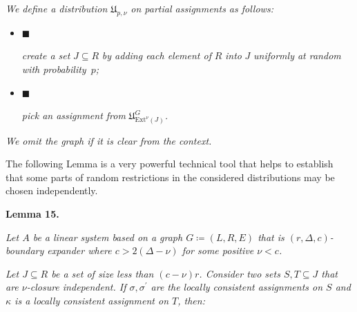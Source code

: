 \emph{We define a distribution $\mathfrak{U}_{p,\nu}$ on partial assignments as follows:}\par


\begin{itemize}


\item[] 
$\blacksquare$ 


\emph{create a set }$J\subseteq R$\emph{ by adding each element of }$R$\emph{ into }$J$\emph{ uniformly at random
with probability }$p$\emph{;}\par





\item[] 
$\blacksquare$ 


\emph{pick an assignment from }$\mathfrak{U}^{G}_{\mathrm{Ext}^{\nu}\left(J\right)}$\emph{.}\par





\end{itemize}




\emph{We omit the graph if it is clear from the context.}\par






The following Lemma is a very powerful technical tool that helps to establish that some parts of random
restrictions in the considered distributions may be chosen independently.\par





\par\medskip\noindent\textbf{
\textbf{Lemma 15}\textbf{.}
}\par



\emph{Let $A$ be a linear system based on a graph $G\coloneqq(L,R,E)$ that is $(r,\Delta,c)$-boundary expander where $c>2(\Delta-\nu)$ for some positive $\nu<c$.}\par




\emph{Let $J\subseteq R$ be a set of size less than $(c-\nu)r$. Consider two sets $S,T\subseteq J$ that
are $\nu$-closure independent. If $\sigma,\sigma^{\prime}$ are the locally consistent assignments on $S$ and
$\kappa$ is a locally consistent assignment on $T$, then:}\par


